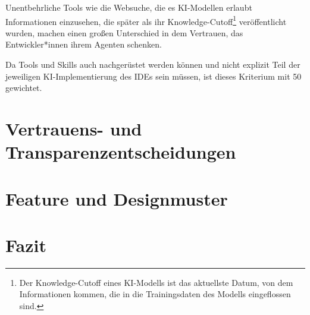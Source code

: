 \documentclass[ngerman]{seminarvorlage}
\begin{document}
Unentbehrliche Tools wie die Websuche, die es KI-Modellen erlaubt Informationen einzusehen, die später als ihr Knowledge-Cutoff\footnote{Der Knowledge-Cutoff eines KI-Modells ist das aktuellste Datum, von dem Informationen kommen, die in die Trainingsdaten des Modells eingeflossen sind.} veröffentlicht wurden, machen einen großen Unterschied in dem Vertrauen, das Entwickler*innen ihrem Agenten schenken.

Da Tools und Skills auch nachgerüstet werden können und nicht explizit Teil der jeweiligen KI-Implementierung des IDEs sein müssen, ist dieses Kriterium mit 50 gewichtet.

\section{Vertrauens- und Transparenzentscheidungen}\label{sec:vertrauen}

\section{Feature und Designmuster}\label{sec:muster}

\section{Fazit}\label{sec:fazit}




\end{document}
